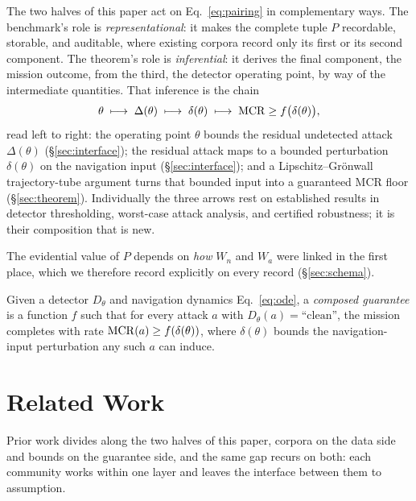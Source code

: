 The two halves of this paper act on Eq.~\eqref{eq:pairing} in complementary
ways. The benchmark's role is \emph{representational}: it makes the complete
tuple $P$ recordable, storable, and auditable, where existing corpora record
only its first or its second component. The theorem's role is
\emph{inferential}: it derives the final component, the mission outcome, from
the third, the detector operating point, by way of the intermediate quantities.
That inference is the chain
\begin{equation}
\label{eq:chain}
\theta \;\longmapsto\; \Delta(\theta) \;\longmapsto\; \delta(\theta)
\;\longmapsto\; \mathrm{MCR} \ge f\big(\delta(\theta)\big),
\end{equation}
read left to right: the operating point $\theta$ bounds the residual undetected
attack $\Delta(\theta)$ (\S\ref{sec:interface}); the residual attack maps to a
bounded perturbation $\delta(\theta)$ on the navigation input
(\S\ref{sec:interface}); and a Lipschitz--Gr\"onwall trajectory-tube argument
turns that bounded input into a guaranteed MCR floor (\S\ref{sec:theorem}).
Individually the three arrows rest on established results in detector
thresholding, worst-case attack analysis, and certified robustness; it is their
composition that is new.

The evidential value of $P$ depends on \emph{how} $W_n$ and $W_a$ were linked in
the first place, which we therefore record explicitly on every record
(\S\ref{sec:schema}).

\begin{definition}
\label{def:composed}
Given a detector $D_\theta$ and navigation dynamics Eq.~\eqref{eq:ode}, a
\emph{composed guarantee} is a function $f$ such that for every attack $a$ with
$D_\theta(a)=\text{``clean''}$, the mission completes with rate
$\mathrm{MCR}(a)\ge f(\delta(\theta))$, where $\delta(\theta)$ bounds the
navigation-input perturbation any such $a$ can induce.
\end{definition}

\section{Related Work}
\label{sec:related}
Prior work divides along the two halves of this paper, corpora on the data side
and bounds on the guarantee side, and the same gap recurs on both: each
community works within one layer and leaves the interface between them to
assumption.

